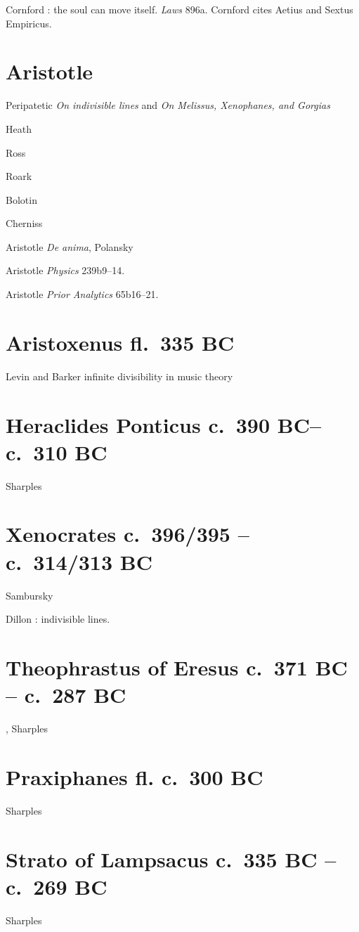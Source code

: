 \documentclass{article}
\begin{document}
Cornford \cite[p.~131]{religion}: the soul can move itself. {\em Laws} 896a. Cornford cites Aetius and Sextus Empiricus.


\section{Aristotle}
Peripatetic {\em On indivisible lines} and {\em On Melissus, Xenophanes, and Gorgias} \cite{hett}

Heath \cite{heatharistotle}

Ross \cite[p.~94]{ross}

Roark \cite{roark}

Bolotin \cite{bolotin}

Cherniss \cite{cherniss}

Aristotle {\em De anima}, Polansky \cite[p.~96]{polansky}

Aristotle {\em Physics} 239b9--14.

Aristotle {\em Prior Analytics} 65b16--21.

\section{Aristoxenus fl.~335 BC}
Levin \cite{levin} and Barker \cite{barker} infinite divisibility in music theory

\section{Heraclides Ponticus c.~390 BC--c.~310 BC}
Sharples \cite{heraclides}

\section{Xenocrates c.~396/395 -- c.~314/313 BC}
Sambursky \cite[p.~91]{sambursky}

Dillon \cite[pp.~111ff]{heirs}: indivisible lines.


\section{Theophrastus of Eresus c.~371 BC -- c.~287 BC},
Sharples \cite{theophrastus}


\section{Praxiphanes fl. c.~300 BC}
Sharples \cite{praxiphanes}

\section{Strato of Lampsacus c.~335 BC -- c.~269 BC}
Sharples \cite{strato}
\end{document}
